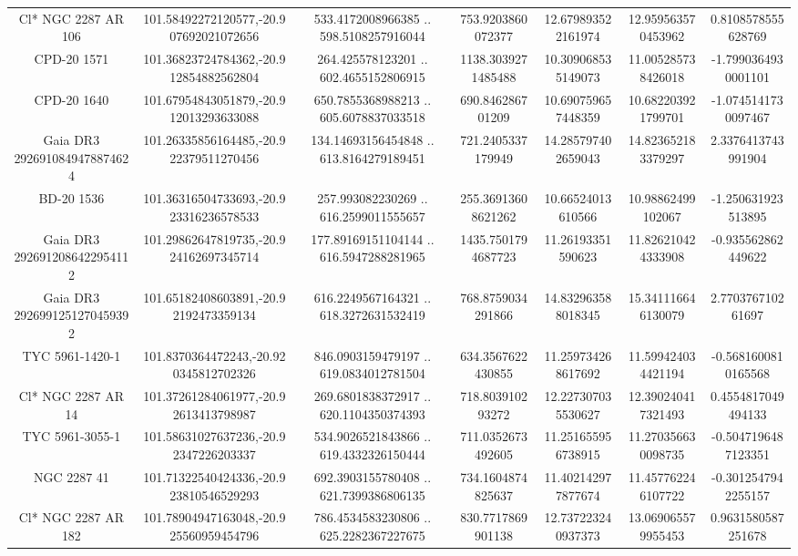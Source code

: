 \begin{table}
\begin{tabular}{ccccccc}
Cl* NGC 2287     AR     106 & 101.58492272120577,-20.907692021072656 & 533.4172008966385 .. 598.5108257916044 & 753.9203860072377 & 12.679893522161974 & 12.959563570453962 & 0.8108578555628769 \\
CPD-20  1571 & 101.36823724784362,-20.912854882562804 & 264.425578123201 .. 602.4655152806915 & 1138.3039271485488 & 10.309068535149073 & 11.005285738426018 & -1.7990364930001101 \\
CPD-20  1640 & 101.67954843051879,-20.912013293633088 & 650.7855368988213 .. 605.6078837033518 & 690.846286701209 & 10.690759657448359 & 10.682203921799701 & -1.0745141730097467 \\
Gaia DR3 2926910849478874624 & 101.26335856164485,-20.922379511270456 & 134.14693156454848 .. 613.8164279189451 & 721.2405337179949 & 14.285797402659043 & 14.823652183379297 & 2.3376413743991904 \\
BD-20  1536 & 101.36316504733693,-20.923316236578533 & 257.993082230269 .. 616.2599011555657 & 255.36913608621262 & 10.66524013610566 & 10.98862499102067 & -1.250631923513895 \\
Gaia DR3 2926912086422954112 & 101.29862647819735,-20.924162697345714 & 177.89169151104144 .. 616.5947288281965 & 1435.7501794687723 & 11.26193351590623 & 11.826210424333908 & -0.935562862449622 \\
Gaia DR3 2926991251270459392 & 101.65182408603891,-20.92192473359134 & 616.2249567164321 .. 618.3272631532419 & 768.8759034291866 & 14.832963588018345 & 15.341116646130079 & 2.770376710261697 \\
TYC 5961-1420-1 & 101.8370364472243,-20.920345812702326 & 846.0903159479197 .. 619.0834012781504 & 634.3567622430855 & 11.259734268617692 & 11.599424034421194 & -0.5681600810165568 \\
Cl* NGC 2287     AR      14 & 101.37261284061977,-20.92613413798987 & 269.6801838372917 .. 620.1104350374393 & 718.803910293272 & 12.227307035530627 & 12.390240417321493 & 0.4554817049494133 \\
TYC 5961-3055-1 & 101.58631027637236,-20.92347226203337 & 534.9026521843866 .. 619.4332326150444 & 711.0352673492605 & 11.251655956738915 & 11.270356630098735 & -0.5047196487123351 \\
NGC  2287    41 & 101.71322540424336,-20.923810546529293 & 692.3903155780408 .. 621.7399386806135 & 734.1604874825637 & 11.402142977877674 & 11.457762246107722 & -0.3012547942255157 \\
Cl* NGC 2287     AR     182 & 101.78904947163048,-20.925560959454796 & 786.4534583230806 .. 625.2282367227675 & 830.7717869901138 & 12.737223240937373 & 13.069065579955453 & 0.9631580587251678 \\

\end{tabular}
\end{table}
